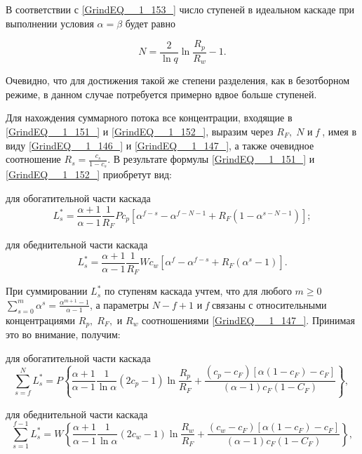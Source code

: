  В соответствии с \ref{GrindEQ__1_153_} число ступеней в идеальном каскаде при выполнении условия $\alpha =\beta $ будет равно

\begin{equation} \label{GrindEQ__1_154_} 
N =\frac{2}{\ln q} \ln \frac{R_{p} }{R_{w} } -1.
\end{equation} 

 Очевидно, что для достижения такой же степени разделения, как в безотборном режиме, в данном случае потребуется примерно вдвое больше ступеней.

 Для нахождения суммарного потока все концентрации, входящие в \ref{GrindEQ__1_151_} и \ref{GrindEQ__1_152_}, выразим через $R_{F} ,\; N$ и \textit{f} , имея в виду \ref{GrindEQ__1_146_} и \ref{GrindEQ__1_147_}, а также очевидное соотношение $R_{s} =\frac{c_{s} }{1-c_{s} } $. В результате формулы \ref{GrindEQ__1_151_} и \ref{GrindEQ__1_152_} приобретут вид:

 для обогатительной части каскада
\begin{equation} \label{GrindEQ__1_155_} 
L_{s}^{*} =\frac{\alpha +1}{\alpha -1} \frac{1}{R_{F} } Pc_{p} \left[\alpha ^{f-s} -\alpha ^{f-N-1} +R_{F} (1-\alpha ^{s-N-1} )\right];           
\end{equation} 

 для обеднительной части каскада
\begin{equation} \label{GrindEQ__1_156_} 
L_{s}^{*} =\frac{\alpha +1}{\alpha -1} \frac{1}{R_{F} } Wc_{w} \left[\alpha ^{f} -\alpha ^{f-s} +R_{F} (\alpha ^{s} -1)\right].                     
\end{equation} 

При суммировании $L_{s}^{*} $ по ступеням каскада учтем, что для любого $m\ge 0$ $\sum _{s=0}^{m}\alpha ^{s}  =\frac{\alpha ^{m+1} -1}{\alpha -1} $, а параметры $N-f+1$ и \textit{f} связаны с относительными концентрациями $R_{p} ,\; R_{F} ,$ и $R_{w} $ соотношениями \ref{GrindEQ__1_147_}. Принимая это во внимание, получим:

              для обогатительной части каскада
\begin{equation} \label{GrindEQ__1_157_} 
\sum _{s=f}^{N}L_{s}^{*}  =P\left\{\frac{\alpha +1}{\alpha -1} \frac{1}{\ln \alpha } (2c_{p} -1)\ln \frac{R_{p} }{R_{F} } +\frac{(c_{p} -c_{F} )\left[\alpha (1-c_{F} )-c_{F} \right]}{(\alpha -1)c_{F} (1-C_{F} )} \right\},~ 
\end{equation} 

              для обеднительной части каскада
\begin{equation} \label{GrindEQ__1_158_} 
\sum _{s=1}^{f-1}L_{s}^{*}  =W\left\{\frac{\alpha +1}{\alpha -1} \frac{1}{\ln \alpha } (2c_{w} -1)\ln \frac{R_{w} }{R_{F} } +\frac{(c_{w} -c_{F} )\left[\alpha (1-c_{F} )-c_{F} \right]}{(\alpha -1)c_{F} (1-C_{F} )} \right\}, 
\end{equation} 

